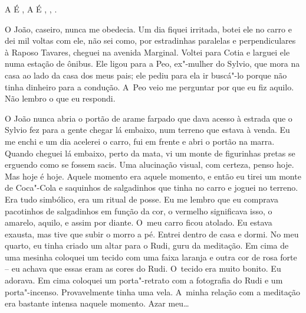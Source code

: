 A  É   ,   A  É    , 
,  .

O João, caseiro, nunca me obedecia. Um dia fiquei irritada, botei ele no
carro e dei mil voltas com ele, não sei como, por estradinhas paralelas
e perpendiculares à Raposo Tavares, cheguei na avenida Marginal. Voltei
para Cotia e larguei ele numa estação de ônibus. Ele ligou para a Peo,
ex"-mulher do Sylvio, que mora na casa ao lado da casa dos meus pais; ele
pediu para ela ir buscá"-lo porque não tinha dinheiro para a condução. A~Peo veio me perguntar por que eu fiz aquilo. Não lembro o que eu
respondi.

O João nunca abria o portão de arame farpado que dava acesso à estrada
que o Sylvio fez para a gente chegar lá embaixo, num terreno que estava
à venda. Eu me enchi e um dia acelerei o carro, fui em frente e abri o
portão na marra. Quando cheguei lá embaixo, perto da mata, vi um monte
de figurinhas pretas se erguendo como se fossem sacis. Uma alucinação
visual, com certeza, penso hoje. Mas hoje é hoje. Aquele momento era
aquele momento, e então eu tirei um monte de Coca"-Cola e saquinhos de
salgadinhos que tinha no carro e joguei no terreno. Era tudo simbólico,
era um ritual de posse. Eu me lembro que eu comprava pacotinhos de
salgadinhos em função da cor, o vermelho significava isso, o amarelo,
aquilo, e assim por diante. O~meu carro ficou atolado. Eu estava
exausta, mas tive que subir o morro a pé. Entrei dentro de casa e dormi.
No meu quarto, eu tinha criado um altar para o Rudi, guru da meditação.
Em cima de uma mesinha coloquei um tecido com uma faixa laranja e outra
cor de rosa forte -- eu achava que essas eram as cores do Rudi. O~tecido
era muito bonito. Eu adorava. Em cima coloquei um porta"-retrato com a
fotografia do Rudi e um porta"-incenso. Provavelmente tinha uma vela. A~minha relação com a meditação era bastante intensa naquele momento. Azar
meu…


